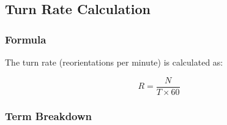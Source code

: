 \documentclass[
  11pt,
]{article}
\begin{document}
\hypertarget{turn-rate-calculation}{%
\subsection{Turn Rate Calculation}\label{turn-rate-calculation}}

\hypertarget{formula}{%
\subsubsection{Formula}\label{formula}}

The turn rate (reorientations per minute) is calculated as:

\[R = \frac{N}{T \times 60}\]

\hypertarget{term-breakdown}{%
\subsubsection{Term Breakdown}\label{term-breakdown}}
\end{document}
